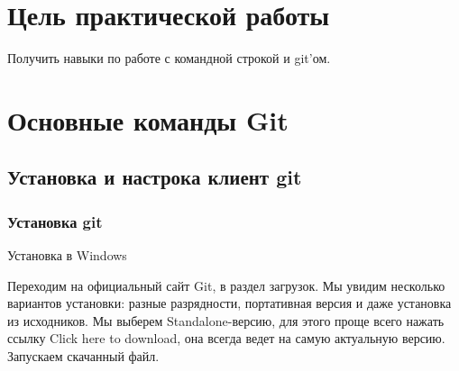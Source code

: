 \graphicspath{{~/Documents/SADT/FirstTask/TheBasics/}}
\chapter*{\LARGE{Цель практической работы}}
Получить навыки по работе с командной строкой и git’ом.

\chapter{Основные команды Git}

\section{Установка и настрока клиент git}
\subsection{Установка git}
Установка в Windows\par
Переходим на официальный сайт Git, в раздел загрузок.
Мы увидим несколько вариантов установки: разные разрядности,
портативная версия и даже установка из исходников.
Мы выберем Standalone-версию, для этого проще всего нажать ссылку
Click here to download, она всегда ведет на самую актуальную версию.
Запускаем скачанный файл.\par

